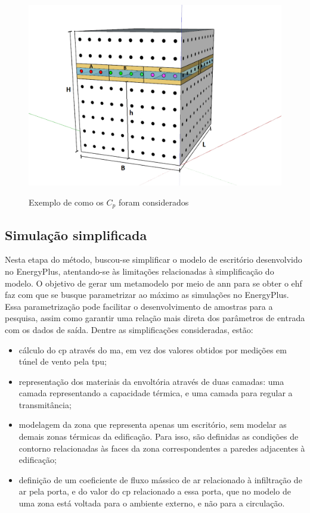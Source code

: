 \documentclass[brazil,hardcopy,openany]{ufscthesis} %
\begin{document}
\begin{figure}[h]
	\centering
	\caption{Exemplo de como os $C_p$ foram considerados}
	\includegraphics[width=.8\linewidth]{img/ex_TPU_h.png}
	\label{fig:tpuwindows}
\end{figure}


\subsection{Simulação simplificada}

Nesta etapa do método, buscou-se simplificar o modelo de escritório desenvolvido no EnergyPlus, atentando-se às limitações relacionadas à simplificação do modelo.
O objetivo de gerar um metamodelo por meio de \acrfull{ann} para se obter o \acrshort{ehf} faz com que se busque parametrizar ao máximo as simulações no EnergyPlus.
Essa parametrização pode facilitar o desenvolvimento de amostras para a pesquisa, assim como garantir uma relação mais direta dos parâmetros de entrada com os dados de saída. 
Dentre as simplificações consideradas, estão:

\begin{itemize}
	\item cálculo do \acrshort{cp} através do \acrlong{ma}, em vez dos valores obtidos por medições em túnel de vento pela \acrshort{tpu};
	\item representação dos materiais da envoltória através de duas camadas: uma camada representando a capacidade térmica, e uma camada para regular a transmitância;  %
	\item modelagem da zona que representa apenas um escritório, sem modelar as demais zonas térmicas da edificação. Para isso, são definidas as condições de contorno relacionadas às faces da zona correspondentes a paredes adjacentes à edificação;
	\item definição de um coeficiente de fluxo mássico de ar relacionado à infiltração de ar pela porta, e do valor do \acrshort{cp} relacionado a essa porta, que no modelo de uma zona está voltada para o ambiente externo, e não para a circulação.
\end{itemize}
\end{document}
